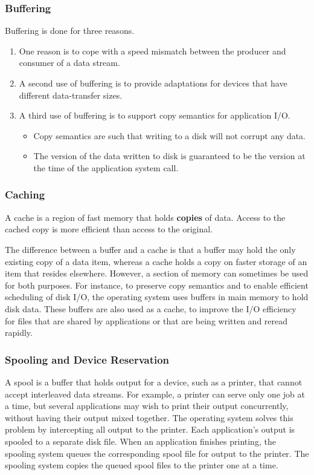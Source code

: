 \subsubsection{Buffering}\label{subsubsec:IO_Buffering}
Buffering is done for three reasons.
\begin{enumerate}[noitemsep]
\item One reason is to cope with a speed mismatch between the producer and consumer of a data stream.
\item A second use of buffering is to provide adaptations for devices that have different data-transfer sizes.
\item A third use of buffering is to support copy semantics for application I/O.
  \begin{itemize}[noitemsep]
  \item Copy semantics are such that writing to a disk will not corrupt any data.
  \item The version of the data written to disk is guaranteed to be the version at the time of the application system call.
  \end{itemize}
\end{enumerate}

\subsubsection{Caching}\label{subsubsec:IO_Caching}
A cache is a region of fast memory that holds \textbf{copies} of data.
Access to the cached copy is more efficient than access to the original.

The difference between a buffer and a cache is that a buffer may hold the only existing copy of a data item, whereas a cache holds a copy on faster storage of an item that resides elsewhere.
However, a section of memory can sometimes be used for both purposes.
For instance, to preserve copy semantics and to enable efficient scheduling of disk I/O, the operating system uses buffers in main memory to hold disk data.
These buffers are also used as a cache, to improve the I/O efficiency for files that are shared by applications or that are being written and reread rapidly.

\subsubsection{Spooling and Device Reservation}\label{subsubsec:Spooling_Device_Reservation}
A spool is a buffer that holds output for a device, such as a printer, that cannot
accept interleaved data streams.
For example, a printer can serve only one job at a time, but several applications may wish to print their output concurrently, without having their output mixed together.
The operating system solves this problem by intercepting all output to the printer.
Each application’s output is spooled to a separate disk file.
When an application finishes printing, the spooling system queues the corresponding spool file for output to the printer.
The spooling system copies the queued spool files to the printer one at a time.


